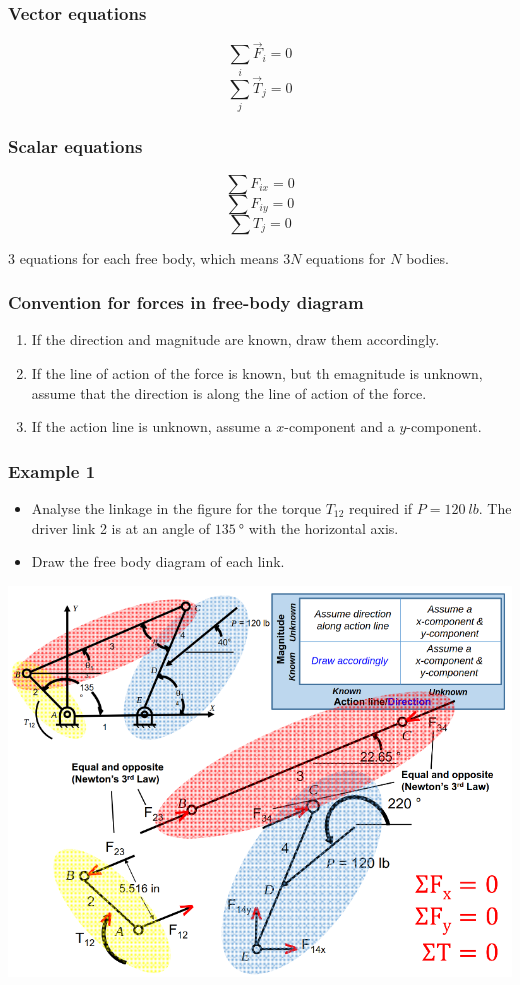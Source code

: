 \documentclass[11pt]{article}
\begin{document}
\subsubsection{Vector equations}
\label{sec:orga24e387}
\[\sum_i \vec{F}_i = 0\]
\[\sum_j \vec{T}_j = 0\]
\subsubsection{Scalar equations}
\label{sec:orgb6f1658}
\[\sum F_{ix} = 0\]
\[\sum F_{iy} = 0\]
\[\sum T_j = 0\]

3 equations for each free body, which means \(3N\) equations for \(N\) bodies.
\subsubsection{Convention for forces in free-body diagram}
\label{sec:org18088bb}
\begin{enumerate}
\item If the direction and magnitude are known, draw them accordingly.
\item If the line of action of the force is known, but th emagnitude is unknown, assume that the direction is along the line of action of the force.
\item If the action line is unknown, assume a \(x\)-component and a \(y\)-component.
\end{enumerate}

 \newpage
\subsubsection{Example 1}
\label{sec:org828c4be}
\begin{itemize}
\item Analyse the linkage in the figure for the torque \(T_{12}\) required if \(P = \qty{120}{lb}\). The driver link 2 is at an angle of \(\qty{135}{\degree}\) with the horizontal axis.
\item Draw the free body diagram of each link.
\end{itemize}

\begin{center}
\includegraphics[width=.9\linewidth]{./images/example-1-free-body-diagram.png}
\end{center}
\end{document}
